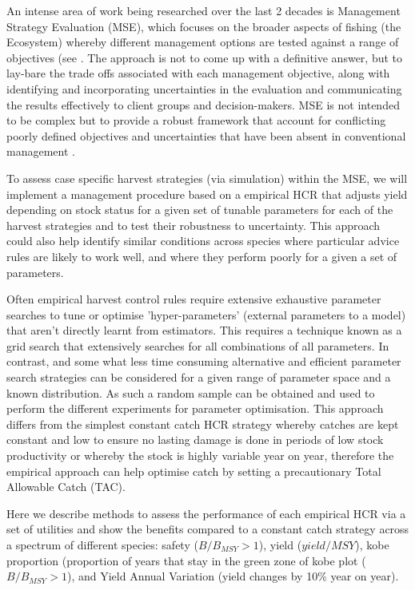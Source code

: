 \documentclass[preprint,12pt]{elsarticle}
\begin{document}
An intense area of work being researched over the last 2 decades is Management Strategy Evaluation (MSE), which focuses on the broader aspects of fishing (the Ecosystem) whereby different management options are tested against a range of objectives (see \cite{kell2007flr}. The approach is not to come up with a definitive answer, but to lay-bare the trade offs associated with each management objective, along with identifying and incorporating uncertainties in the evaluation and communicating the results effectively to client groups and decision-makers. MSE is not intended to be complex but to provide a robust framework that account for conflicting poorly defined objectives and uncertainties that have been absent in conventional management \cite{kell2007flr}. 

To assess case specific harvest strategies (via simulation) within the MSE, we will implement a management procedure based on a empirical HCR that adjusts yield depending on stock status for a given set of tunable parameters for each of the harvest strategies and to test their robustness to uncertainty.  This approach could also help identify similar conditions across species where particular advice rules are likely to work well, and where they perform poorly for a given a set of parameters. 

Often empirical harvest control rules require extensive exhaustive parameter searches to tune or optimise 'hyper-parameters' (external parameters to a model) that aren’t directly learnt from estimators.  This requires a technique known as a grid search that extensively searches for all combinations of all parameters. In contrast, and some what less time consuming alternative and efficient parameter search strategies can be considered for a given range of parameter space and a known distribution.  As such a random sample can be obtained and used to perform the different experiments for parameter optimisation. This approach differs from the simplest constant catch HCR strategy whereby catches are kept constant and low to ensure no lasting damage is done in periods of low stock productivity or whereby the stock is highly variable year on year, therefore the empirical approach can help optimise catch by setting a precautionary Total Allowable Catch (TAC). 

Here we describe methods to assess the performance of each empirical HCR via a set of utilities and show the benefits compared to a constant catch strategy across a spectrum of different species: safety ($B/B_{MSY} >1$), yield ($yield/MSY$), kobe proportion (proportion of years that stay in the green zone of kobe plot ($B/B_{MSY} >1$), and Yield Annual Variation (yield changes by 10\% year on year). 
\end{document}
